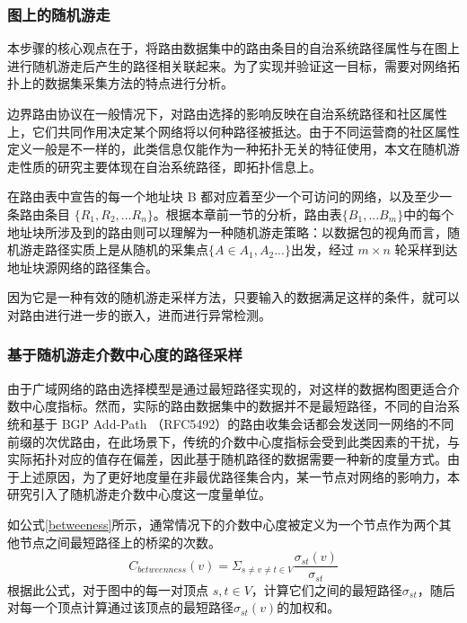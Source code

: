 \subsubsection{图上的随机游走}

本步骤的核心观点在于，将路由数据集中的路由条目的自治系统路径属性与在图上进行随机游走后产生的路径相关联起来。为了实现并验证这一目标，需要对网络拓扑上的数据集采集方法的特点进行分析。

边界路由协议在一般情况下，对路由选择的影响反映在自治系统路径和社区属性上，它们共同作用决定某个网络将以何种路径被抵达。由于不同运营商的社区属性定义一般是不一样的，此类信息仅能作为一种拓扑无关的特征使用，本文在随机游走性质的研究主要体现在自治系统路径，即拓扑信息上。

在路由表中宣告的每一个地址块 B 都对应着至少一个可访问的网络，以及至少一条路由条目 $\{R_1, R_2, ... R_n\}$。根据本章前一节的分析，路由表$\{B_1,...B_m\}$中的每个地址块所涉及到的路由则可以理解为一种随机游走策略：以数据包的视角而言，随机游走路径实质上是从随机的采集点$\{A\in{A_1, A_2...}\}$出发，经过 $m \times n$ 轮采样到达地址块源网络的路径集合。

因为它是一种有效的随机游走采样方法，只要输入的数据满足这样的条件，就可以对路由进行进一步的嵌入，进而进行异常检测。

\subsubsection{基于随机游走介数中心度的路径采样}

由于广域网络的路由选择模型是通过最短路径实现的，对这样的数据构图更适合介数中心度指标。然而，实际的路由数据集中的数据并不是最短路径，不同的自治系统和基于 BGP Add-Path （RFC5492）的路由收集会话都会发送同一网络的不同前缀的次优路由，在此场景下，传统的介数中心度指标会受到此类因素的干扰，与实际拓扑对应的值存在偏差，因此基于随机路径的数据需要一种新的度量方式。由于上述原因，为了更好地度量在非最优路径集合内，某一节点对网络的影响力，本研究引入了随机游走介数中心度这一度量单位。

如公式\ref{betweeness}所示，通常情况下的介数中心度被定义为一个节点作为两个其他节点之间最短路径上的桥梁的次数。
\begin{equation} \label{betweeness}
C_{betweenness}(v) = \Sigma_{s \neq v \neq t \in V}\frac{\sigma_{st}(v)}{\sigma_{st}}
\end{equation}
根据此公式，对于图中的每一对顶点 $s,t \in V$，计算它们之间的最短路径$\sigma_{st}$，随后对每一个顶点计算通过该顶点的最短路径$\sigma_{st}(v)$的加权和。

